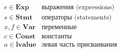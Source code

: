 \documentclass[12pt]{matmex-diploma}
\begin{document}
\clearpage

\begin{center}
$
\begin{array}{ll}
e \in \textbf{Exp}  & \mbox{выражения (expressions)} \\
s \in \textbf{Stmt}  & \mbox{операторы (statements)} \\
x,f \in \textbf{Var} & \mbox{переменные} \\
c \in \textbf{Const}  & \mbox{константы} \\
a \in \textbf{lvalue} & \mbox{левая часть присваивания} \\[1ex]
\end{array}
$
\captionsetup{type=lstlisting}
\label{tbl:notation2}
\end{center}
\end{document}
